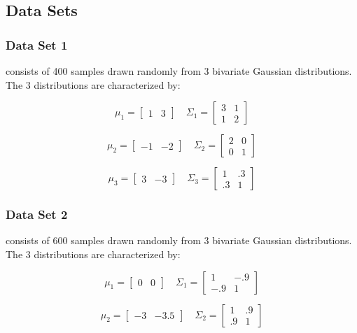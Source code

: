 \documentclass[conference]{IEEEtran}
\begin{document}
\subsection{Data Sets}

\subsubsection{Data Set 1}
consists of 400 samples drawn randomly from 3 bivariate Gaussian distributions.  The 3 distributions are characterized by:

$$
\mu_1 = 
\begin{bmatrix} 
1 & 3  
\end{bmatrix}
\quad
\Sigma_1 = 
\begin{bmatrix} 
3 & 1  \\
1 & 2
\end{bmatrix}
$$

$$
\mu_2 = 
\begin{bmatrix} 
-1 & -2  
\end{bmatrix}
\quad
\Sigma_2 = 
\begin{bmatrix} 
2 & 0  \\
0 & 1
\end{bmatrix}
$$

$$
\mu_3 = 
\begin{bmatrix} 
3 & -3  
\end{bmatrix}
\quad
\Sigma_3 = 
\begin{bmatrix} 
1 & .3  \\
.3 & 1
\end{bmatrix}
$$

\subsubsection{Data Set 2}
 consists of 600 samples drawn randomly from 3 bivariate Gaussian distributions.  The 3 distributions are characterized by:

$$
\mu_1 = 
\begin{bmatrix} 
0 & 0  
\end{bmatrix}
\quad
\Sigma_1 = 
\begin{bmatrix} 
1 & -.9  \\
-.9 & 1
\end{bmatrix}
$$

$$
\mu_2 = 
\begin{bmatrix} 
-3 & -3.5  
\end{bmatrix}
\quad
\Sigma_2 = 
\begin{bmatrix} 
1 & .9  \\
.9 & 1
\end{bmatrix}
$$
\end{document}
